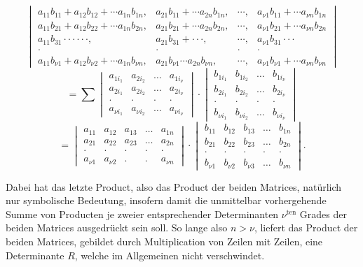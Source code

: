 \[
\begin{vmatrix}
a_{11}b_{11}+a_{12}b_{12}+\cdots a_{1n}b_{1n}, & a_{21}b_{11}+\cdots a_{2n}b_{1n}, & \cdots, & a_{\nu 1}b_{11}+\cdots a_{\nu n}b_{1n}\\
a_{11}b_{21}+a_{12}b_{22}+\cdots a_{1n}b_{2n}, & a_{21}b_{21}+\cdots a_{2n}b_{2n}, & \cdots, & a_{\nu 1}b_{21}+\cdots a_{\nu n}b_{2n}\\
a_{11}b_{31}\cdot\cdot\cdot\cdot\cdot\cdot, & a_{21}b_{31}+\cdot\cdot\cdot, & \cdots, & a_{\nu 1}b_{31}\cdot\cdot\cdot\\
\cdot & \cdot & \cdot & \cdot\\
a_{11}b_{\nu 1}+a_{12}b_{\nu 2}+\cdots a_{1n}b_{\nu n}, & a_{21}b_{\nu 1}\cdots a_{2n}b_{\nu n}, & \cdots, & a_{\nu 1}b_{\nu 1}+\cdots a_{\nu n}b_{\nu n}
\end{vmatrix}
\]
\[
=\sum
\begin{vmatrix}
a_{1i_1} & a_{2i_2} & \dots & a_{1i_\nu}\\
a_{2i_1} & a_{2i_2} & \dots & a_{2i_\nu}\\
\cdot & \cdot & \cdot & \cdot\\
a_{\nu i_1} & a_{\nu i_2} & \dots & a_{\nu i_\nu}
\end{vmatrix}
\cdot
\begin{vmatrix}
b_{1i_1} & b_{1i_2} & \dots & b_{1i_\nu}\\
b_{2i_1} & b_{2i_2} & \dots & b_{2i_\nu}\\
\cdot & \cdot & \cdot & \cdot\\
b_{\nu i_1} & b_{\nu i_2} & \dots & b_{\nu i_\nu}
\end{vmatrix}
\]
\[
=
\begin{vmatrix}
a_{11} & a_{12} & a_{13} & \dots & a_{1n}\\
a_{21} & a_{22} & a_{23} & \dots & a_{2n}\\
\cdot & \cdot & \cdot & \cdot & \cdot\\
a_{\nu 1} & a_{\nu 2} & . & . & a_{\nu n}
\end{vmatrix}
\cdot
\begin{vmatrix}
b_{11} & b_{12} & b_{13} & \dots & b_{1n}\\
b_{21} & b_{22} & b_{23} & \dots & b_{2n}\\
\cdot & \cdot & \cdot & \cdot & \cdot\\
b_{\nu 1} & b_{\nu 2} & b_{\nu 3} & \dots & b_{\nu n}
\end{vmatrix}.
\]

Dabei hat das letzte Product, also das Product der beiden Matrices, natürlich nur symbolische Bedeutung, insofern damit die unmittelbar vorhergehende Summe von Producten je zweier entsprechender Determinanten $\nu^{\text{ten}}$ Grades der beiden Matrices ausgedrückt sein soll. So lange also $n>\nu$, liefert das Product der beiden Matrices, gebildet durch Multiplication von Zeilen mit Zeilen, eine Determinante $R$, welche im Allgemeinen nicht verschwindet.

